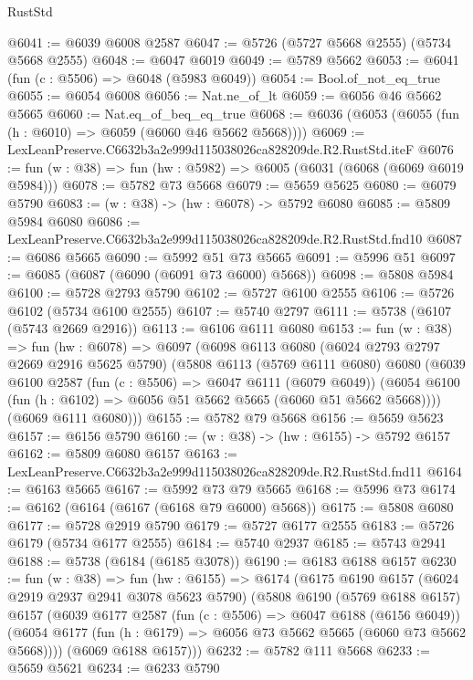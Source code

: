 \begin{lexlean}{RustStd}
\begin{coremodule}
@6041 := @6039 @6008 @2587
@6047 := @5726 (@5727 @5668 @2555) (@5734 @5668 @2555)
@6048 := @6047 @6019
@6049 := @5789 @5662
@6053 := @6041 (fun (c : @5506) => @6048 (@5983 @6049))
@6054 := Bool.of_not_eq_true
@6055 := @6054 @6008
@6056 := Nat.ne_of_lt
@6059 := @6056 @46 @5662 @5665
@6060 := Nat.eq_of_beq_eq_true
@6068 := @6036 (@6053 (@6055 (fun (h : @6010) => @6059 (@6060 @46 @5662 @5668))))
@6069 := LexLeanPreserve.C6632b3a2e999d115038026ca828209de.R2.RustStd.iteF
@6076 := fun (w : @38) => fun (hw : @5982) => @6005 (@6031 (@6068 (@6069 @6019 @5984)))
@6078 := @5782 @73 @5668
@6079 := @5659 @5625
@6080 := @6079 @5790
@6083 := (w : @38) -> (hw : @6078) -> @5792 @6080
@6085 := @5809 @5984 @6080
@6086 := LexLeanPreserve.C6632b3a2e999d115038026ca828209de.R2.RustStd.fnd10
@6087 := @6086 @5665
@6090 := @5992 @51 @73 @5665
@6091 := @5996 @51
@6097 := @6085 (@6087 (@6090 (@6091 @73 @6000) @5668))
@6098 := @5808 @5984
@6100 := @5728 @2793 @5790
@6102 := @5727 @6100 @2555
@6106 := @5726 @6102 (@5734 @6100 @2555)
@6107 := @5740 @2797
@6111 := @5738 (@6107 (@5743 @2669 @2916))
@6113 := @6106 @6111 @6080
@6153 := fun (w : @38) =>
  fun (hw : @6078) =>
  @6097
    (@6098
      @6113
      @6080
      (@6024 @2793 @2797 @2669 @2916 @5625 @5790)
      (@5808
        @6113
        (@5769 @6111 @6080)
        @6080
        (@6039
          @6100
          @2587
          (fun (c : @5506) => @6047 @6111 (@6079 @6049))
          (@6054 @6100 (fun (h : @6102) => @6056 @51 @5662 @5665 (@6060 @51 @5662 @5668))))
        (@6069 @6111 @6080)))
@6155 := @5782 @79 @5668
@6156 := @5659 @5623
@6157 := @6156 @5790
@6160 := (w : @38) -> (hw : @6155) -> @5792 @6157
@6162 := @5809 @6080 @6157
@6163 := LexLeanPreserve.C6632b3a2e999d115038026ca828209de.R2.RustStd.fnd11
@6164 := @6163 @5665
@6167 := @5992 @73 @79 @5665
@6168 := @5996 @73
@6174 := @6162 (@6164 (@6167 (@6168 @79 @6000) @5668))
@6175 := @5808 @6080
@6177 := @5728 @2919 @5790
@6179 := @5727 @6177 @2555
@6183 := @5726 @6179 (@5734 @6177 @2555)
@6184 := @5740 @2937
@6185 := @5743 @2941
@6188 := @5738 (@6184 (@6185 @3078))
@6190 := @6183 @6188 @6157
@6230 := fun (w : @38) =>
  fun (hw : @6155) =>
  @6174
    (@6175
      @6190
      @6157
      (@6024 @2919 @2937 @2941 @3078 @5623 @5790)
      (@5808
        @6190
        (@5769 @6188 @6157)
        @6157
        (@6039
          @6177
          @2587
          (fun (c : @5506) => @6047 @6188 (@6156 @6049))
          (@6054 @6177 (fun (h : @6179) => @6056 @73 @5662 @5665 (@6060 @73 @5662 @5668))))
        (@6069 @6188 @6157)))
@6232 := @5782 @111 @5668
@6233 := @5659 @5621
@6234 := @6233 @5790

\end{coremodule}
\end{lexlean}
